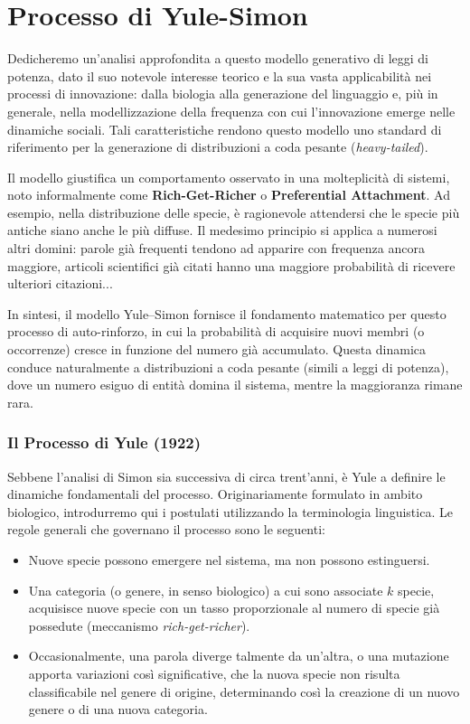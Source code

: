 \section{Processo di Yule-Simon}
Dedicheremo un'analisi approfondita a questo modello generativo di leggi di potenza, dato il suo notevole interesse teorico e la sua vasta applicabilità nei processi di innovazione: dalla biologia alla generazione del linguaggio e, più in generale, nella modellizzazione della frequenza con cui l'innovazione emerge nelle dinamiche sociali. Tali caratteristiche rendono questo modello uno standard di riferimento per la generazione di distribuzioni a coda pesante (\textit{heavy-tailed}).

Il modello giustifica un comportamento osservato in una molteplicità di sistemi, noto informalmente come \textbf{Rich-Get-Richer}  o \textbf{Preferential Attachment}. Ad esempio, nella distribuzione delle specie, è ragionevole attendersi che le specie più antiche siano anche le più diffuse. Il medesimo principio si applica a numerosi altri domini: parole già frequenti tendono ad apparire con frequenza ancora maggiore, articoli scientifici già citati hanno una maggiore probabilità di ricevere ulteriori citazioni...

In sintesi, il modello Yule–Simon fornisce il fondamento matematico per questo processo di auto-rinforzo, in cui la probabilità di acquisire nuovi membri (o occorrenze) cresce in funzione del numero già accumulato. Questa dinamica conduce naturalmente a distribuzioni a coda pesante (simili a leggi di potenza), dove un numero esiguo di entità domina il sistema, mentre la maggioranza rimane rara.


\subsubsection*{Il Processo di Yule (1922)}
Sebbene l'analisi di Simon sia successiva di circa trent'anni, è Yule a definire le dinamiche fondamentali del processo. Originariamente formulato in ambito biologico, introdurremo qui i postulati utilizzando la terminologia linguistica. Le regole generali che governano il processo sono le seguenti:

\begin{itemize}
    \item Nuove specie possono emergere nel sistema, ma non possono estinguersi.
    \item Una categoria (o genere, in senso biologico) a cui sono associate $k$ specie, acquisisce nuove specie con un tasso proporzionale al numero di specie già possedute (meccanismo \textit{rich-get-richer}).
    \item Occasionalmente, una parola diverge talmente da un'altra, o una mutazione apporta variazioni così significative, che la nuova specie non risulta classificabile nel genere di origine, determinando così la creazione di un nuovo genere o di una nuova categoria.
\end{itemize}

